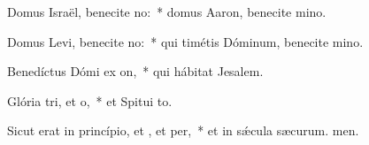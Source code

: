 \item Domus Israël, benecite no:~* domus Aaron, benecite mino.
\item Domus Levi, benecite no:~* qui timétis Dóminum, benecite mino.
\item Benedíctus Dómi ex on,~* qui hábitat  Jesalem.
\item Glória tri, et o,~* et Spitui to.
\item Sicut erat in princípio, et , et per,~* et in sǽcula sæcurum. men.
